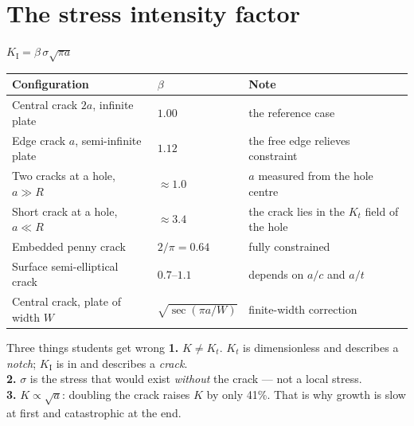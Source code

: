 \documentclass[aspectratio=169,10pt]{beamer}
\begin{document}
\section{The stress intensity factor}

\begin{frame}{$K_{\mathrm I}=\beta\,\sigma\sqrt{\pi a}$}
\footnotesize
\begin{tabular}{@{}llp{6.8cm}@{}}
\toprule
Configuration & $\beta$ & Note \\
\midrule
Central crack $2a$, infinite plate & $1.00$ & the reference case \\
Edge crack $a$, semi-infinite plate & $1.12$ & the free edge relieves constraint \\
Two cracks at a hole, $a\gg R$ & $\approx1.0$ & $a$ measured from the hole centre \\
Short crack at a hole, $a\ll R$ & $\approx 3.4$ & the crack lies in the $K_t$ field of the hole \\
Embedded penny crack & $2/\pi=0.64$ & fully constrained \\
Surface semi-elliptical crack & $0.7$--$1.1$ & depends on $a/c$ and $a/t$ \\
Central crack, plate of width $W$ & $\sqrt{\sec(\pi a/W)}$ & finite-width correction \\
\bottomrule
\end{tabular}
\vspace{4pt}

\normalsize
\begin{alertblock}{Three things students get wrong}
\footnotesize
\textbf{1.} $K\neq K_t$. $K_t$ is dimensionless and describes a \emph{notch}; $K_{\mathrm I}$ is in \si{\MParm} and describes a \emph{crack}.\\
\textbf{2.} $\sigma$ is the stress that would exist \emph{without} the crack --- not a local stress.\\
\textbf{3.} $K\propto\sqrt{a}$: doubling the crack raises $K$ by only 41\%. That is why growth is slow at first and catastrophic at the end.
\end{alertblock}
\end{frame}
\end{document}
